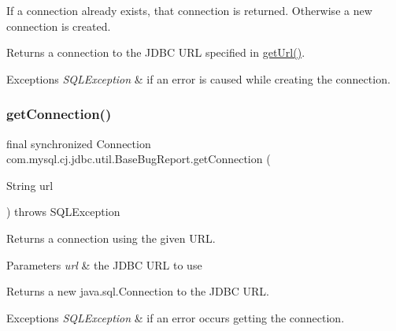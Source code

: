 If a connection already exists, that connection is returned. Otherwise a new connection is created.

\begin{DoxyReturn}{Returns}
a connection to the J\+D\+BC U\+RL specified in \mbox{\hyperlink{classcom_1_1mysql_1_1cj_1_1jdbc_1_1util_1_1_base_bug_report_af253a8d960912715ba0cc0fe1766c4d6}{get\+Url()}}.
\end{DoxyReturn}

\begin{DoxyExceptions}{Exceptions}
{\em S\+Q\+L\+Exception} & if an error is caused while creating the connection. \\
\hline
\end{DoxyExceptions}
\mbox{\label{classcom_1_1mysql_1_1cj_1_1jdbc_1_1util_1_1_base_bug_report_a0bd5313cdb5db035162bf6ad01a1f507}} 
\subsubsection{\texorpdfstring{get\+Connection()}{getConnection()}\hspace{0.1cm}{\footnotesize\ttfamily [2/3]}}
{\footnotesize\ttfamily final synchronized Connection com.\+mysql.\+cj.\+jdbc.\+util.\+Base\+Bug\+Report.\+get\+Connection (\begin{DoxyParamCaption}\item[{String}]{url }\end{DoxyParamCaption}) throws S\+Q\+L\+Exception}

Returns a connection using the given U\+RL.


\begin{DoxyParams}{Parameters}
{\em url} & the J\+D\+BC U\+RL to use \\
\hline
\end{DoxyParams}
\begin{DoxyReturn}{Returns}
a new java.\+sql.\+Connection to the J\+D\+BC U\+RL. 
\end{DoxyReturn}

\begin{DoxyExceptions}{Exceptions}
{\em S\+Q\+L\+Exception} & if an error occurs getting the connection. \\
\hline
\end{DoxyExceptions}
\mbox{\label{classcom_1_1mysql_1_1cj_1_1jdbc_1_1util_1_1_base_bug_report_a6eea476d9a67e9c328c88541f7a11ca3}} 
